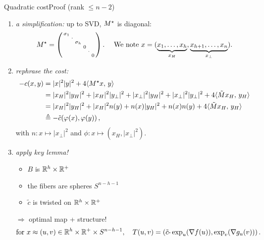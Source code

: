 \documentclass[9pt,xcolor={dvipsnames}]{beamer}
\begin{document}
\begin{frame}{Quadratic cost}{Proof (rank $\leq n-2$)}
    \begin{center}
        \begin{enumerate}
            \item \emph{a simplification:} up to SVD, $M^\star$ is diagonal:
                $$M^\star=\left(\begin{smallmatrix}
                    \sigma_1 & & & & &\\
                    & \cdot & & & &\\
                    &  & \sigma_h & & &\\
                    &  &  & 0 & &\\
                    &  &  & & \cdot & \\
                    &  &  & &  & 0 \\
                \end{smallmatrix}\right).\quad\text{ We note } x=(\underbrace{x_1,\dots,x_h}_{x_H},\underbrace{x_{h+1},\dots,x_n}_{x_\perp}).$$
            \item \emph{rephrase the cost:}
                \begin{align*}
                    -c(x,y) & =|x|^{2}|y|^{2}+4\langle M^\star x,\,y\rangle \\
                    & =|x_{H}|^{2}|y_{H}|^{2}+|x_{H}|^{2}|y_{\perp}|^{2}+|x_{\perp}|^{2}|y_{H}|^{2}+|x_{\perp}|^{2}|y_{\perp}|^{2}+4\langle \tilde Mx_{H},\, y_{H}\rangle\\
                    & =|x_{H}|^{2}|y_{H}|^{2}+|x_{H}|^{2}n(y)+n(x)|y_{H}|^{2}+n(x)n(y)+4\langle \tilde Mx_{H},\, y_{H}\rangle\\
                    & \triangleq -\tilde c(\varphi(x),\varphi(y))\,,
                \end{align*}
                with $n: x\mapsto |x_{\perp}|^2$ and $\phi: x\mapsto (x_{H},|x_{\perp}|^2)$.
            \item \emph{apply key lemma!} \begin{itemize}
                \item $B$ is $\mathbb{R}^h\times\mathbb{R}^+$
                \item the fibers are spheres $ S^{n-h-1}$
                \item $\tilde c$ is {twisted} on $\mathbb{R}^h\times\mathbb{R}^+$
            \end{itemize}
            \vfill
        \item[$\Rightarrow$] optimal map + structure!
        $$\text{for } x\approx (u,v) \in \mathbb{R}^h\times\mathbb{R}^+\times S^{n-h-1},\quad T(u,v)=\left(\tilde c\text{-}\exp_{u}(\nabla f(u)), \exp_{v}(\nabla g_{u}(v))\right).$$
        \hfill\square
        \end{enumerate}
    \end{center}
\end{frame}
\end{document}
